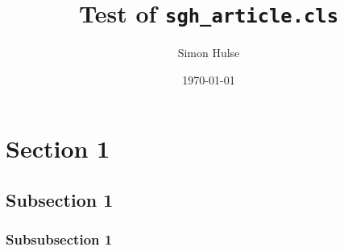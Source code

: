 \documentclass{sgh_article}
\author{Simon Hulse}
\date{\today}
\title{Test of \texttt{sgh\_article.cls}}
\begin{document}
    \maketitle
    \tableofcontents
    \section{Section 1}
    \lipsum[1]\cite{texbook}

    \lipsum[2]
    \subsection{Subsection 1}
    \lipsum[3]\cite{latex2e}

    \lipsum[4]
    \subsubsection{Subsubsection 1}
    \lipsum[5]\cite{latex:companion}

    \printbibliography
\end{document}
